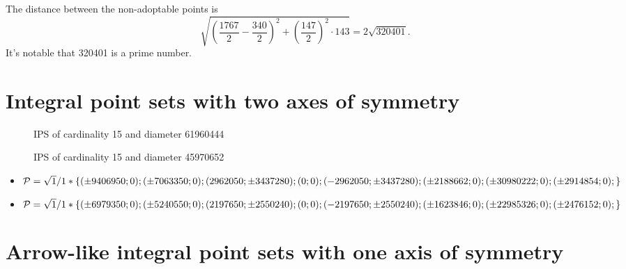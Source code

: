 \documentclass[12pt]{article}
\theoremstyle{theorem}
\theoremstyle{dfn}
\theoremstyle{remark}
\begin{document}
The distance between the non-adoptable points is
\begin{equation}
	\sqrt{\left(\frac{1767}{2} - \frac{340}{2}\right)^2 + \left(\frac{147}{2}\right)^2\cdot143} = 2\sqrt{320401}
	.
\end{equation}
It's notable that 320401 is a prime number.

\section{Integral point sets with two axes of symmetry}

\begin{figure}[h!]
\parbox{1\linewidth}{\caption{IPS of cardinality 15 and diameter 61960444}
\label{15_61960444_1.png}}
\end{figure}

\begin{figure}[h!]
\parbox{1\linewidth}{\caption{IPS of cardinality 15 and diameter 45970652}
\label{15_45970652_1.png}}
\end{figure}

\begin{itemize}
\item
$\mathcal{P}=\sqrt{1}/1*\{
( \pm9406950 ; 0);
( \pm7063350 ; 0);
( 2962050 ; \pm3437280);
( 0 ; 0);
( -2962050 ; \pm3437280);\\
( \pm2188662 ; 0);
( \pm30980222 ; 0);
( \pm2914854 ; 0);
\}$

\item
$\mathcal{P}=\sqrt{1}/1*\{
( \pm6979350 ; 0);
( \pm5240550 ; 0);
( 2197650 ; \pm2550240);
( 0 ; 0);
( -2197650 ; \pm2550240);\\
( \pm1623846 ; 0);
( \pm22985326 ; 0);
( \pm2476152 ; 0);
\}$
\end{itemize}





\section{Arrow-like integral point sets with one axis of symmetry}
\end{document}
